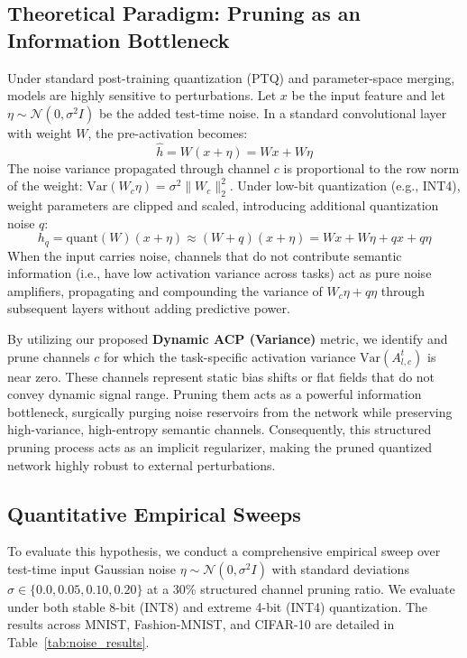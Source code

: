 \documentclass{article}
\theoremstyle{plain}
\theoremstyle{definition}
\theoremstyle{remark}
\begin{document}
\subsection{Theoretical Paradigm: Pruning as an Information Bottleneck}
Under standard post-training quantization (PTQ) and parameter-space merging, models are highly sensitive to perturbations. Let $x$ be the input feature and let $\eta \sim \mathcal{N}(0, \sigma^2 I)$ be the added test-time noise. In a standard convolutional layer with weight $W$, the pre-activation becomes:
\begin{equation}
    \hat{h} = W (x + \eta) = W x + W \eta
\end{equation}
The noise variance propagated through channel $c$ is proportional to the row norm of the weight: $\text{Var}(W_c \eta) = \sigma^2 \|W_c\|_2^2$. Under low-bit quantization (e.g., INT4), weight parameters are clipped and scaled, introducing additional quantization noise $q$:
\begin{equation}
    h_q = \text{quant}(W) (x + \eta) \approx (W + q) (x + \eta) = Wx + W\eta + qx + q\eta
\end{equation}
When the input carries noise, channels that do not contribute semantic information (i.e., have low activation variance across tasks) act as pure noise amplifiers, propagating and compounding the variance of $W_c \eta + q \eta$ through subsequent layers without adding predictive power. 

By utilizing our proposed \textbf{Dynamic ACP (Variance)} metric, we identify and prune channels $c$ for which the task-specific activation variance $\text{Var}(A^t_{l, c})$ is near zero. These channels represent static bias shifts or flat fields that do not convey dynamic signal range. Pruning them acts as a powerful information bottleneck, surgically purging noise reservoirs from the network while preserving high-variance, high-entropy semantic channels. Consequently, this structured pruning process acts as an implicit regularizer, making the pruned quantized network highly robust to external perturbations.

\subsection{Quantitative Empirical Sweeps}
To evaluate this hypothesis, we conduct a comprehensive empirical sweep over test-time input Gaussian noise $\eta \sim \mathcal{N}(0, \sigma^2 I)$ with standard deviations $\sigma \in \{0.0, 0.05, 0.10, 0.20\}$ at a 30\% structured channel pruning ratio. We evaluate under both stable 8-bit (INT8) and extreme 4-bit (INT4) quantization. The results across MNIST, Fashion-MNIST, and CIFAR-10 are detailed in Table~\ref{tab:noise_results}.
\end{document}
